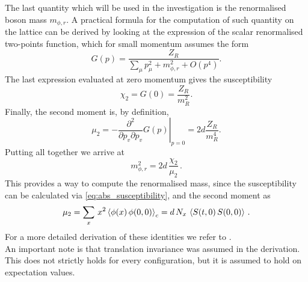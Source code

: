 The last quantity which will be used in the investigation is the renormalised boson mass $m_{\phi,r}$. A practical formula for the computation of such quantity on the lattice can be derived by looking at the expression of the scalar renormalised two-points function, which for small momentum assumes the form
\begin{equation*}
    G(p)=\frac{Z_R}{\sum_\mu p_\mu^2+m_{\phi, r}^2+O\left(p^4\right)}.
\end{equation*}
The last expression evaluated at zero momentum gives the susceptibility 
\begin{equation*}
    \chi_2=G(0)=\frac{Z_R}{m_R^2}.
\end{equation*}
Finally, the second moment is, by definition,
\begin{equation*}
    \mu_2=-\left.\frac{\partial^2}{\partial p_v \partial p_v} G(p)\right|_{p=0}=2 d \frac{Z_R}{m_R^4}.
\end{equation*}
Putting all together we arrive at
\begin{equation*}
    m_{\phi, r}^2 = 2d \, \frac{\chi_2}{\mu_2} \, .
\end{equation*}
This provides a way to compute the renormalised mass, since the susceptibility can be calculated via \eqref{eq:abs_susceptibility}, and the second moment as 
\begin{equation*}
    \mu_2 = \sum_x \, x^2 \left\langle \phi(x) \, \phi(0,0) \right\rangle_c = d \, N_x \, \left\langle S(t,0) \, S(0,0) \right\rangle \, .
\end{equation*}
For a more detailed derivation of these identities we refer to \cite{Pawlowski2017CoolingNoise}. \\
An important note is that translation invariance was assumed in the derivation. This does not strictly holds for every configuration, but it is assumed to hold on expectation values.